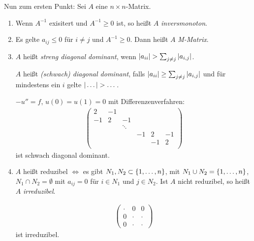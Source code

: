 Nun zum ersten Punkt: Sei $A$ eine $n \times n$-Matrix.
\begin{definition}
\renewcommand{\labelenumi}{(\roman{enumi})}
  \begin{enumerate}
  \item Wenn $A^{-1}$ exisitert und $A^{-1} \geq 0$ ist, so heißt $A$ \emph{inversmonoton}. 
\item Es gelte $a_{ij} \leq 0$ für $i \neq j$ und $A^{-1} \geq 0$. Dann heißt $A$ \emph{M-Matrix}.
\item $A$ heißt \emph{streng diagonal dominant}, wenn $\norm{a_{ii}}> \sum_{j \neq j} \norm {a_{i,j}}$.

$A$ heißt \emph{(schwach) diagonal dominant}, falls $|a_{ii}| \geq \sum_{j \neq j} |a_{i,j}|$ und für mindestens ein $i$ gelte $|\dots| > \dots$.

\begin{beispiel*}
  $-u'' = f$, $u(0) = u(1) = 0$ mit Differenzenverfahren:
  \begin{align*}
    \begin{pmatrix}
      2 &-1 & & & & \\ 
      -1 &2 &-1  & & & \\ 
       & & \ddots & & & \\ 
       & & &-1 &2 &-1 \\ 
       & & & &-1 &2 \\ 
    \end{pmatrix}
  \end{align*}
ist schwach diagonal dominant.
\end{beispiel*}

\item $A$ heißt reduzibel $\Leftrightarrow$  es gibt $N_1, N_2 \subset \left\{ 1, \dots, n \right\}$, mit $N_1 \cup N_2 = \left\{ 1, \dots, n \right\}$, $N_1 \cap N_2 = \emptyset$ mit $a_{ij} = 0$ für $i \in N_1$ und $j  \in N_2$. Ist $A$ nicht reduzibel, so heißt $A$ \emph{irreduzibel}.
  \begin{beispiel*}
    \begin{align*}
      \begin{pmatrix}
        \cdot & 0&0\\
0 &\cdot &\cdot\\
0 &\cdot &\cdot
      \end{pmatrix}
    \end{align*}
ist irreduzibel.
  \end{beispiel*}
  \end{enumerate}
\end{definition}
